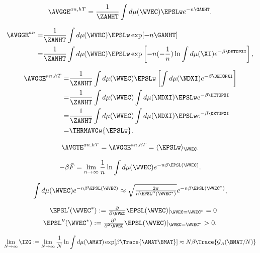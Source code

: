 \begin{align}
  \label{eqn:avgge_anhT}
  \AVGGE^{an, hT} = \frac{1}{\ZANHT}\int d\mu(\WVEC) \EPSLw e^{-n\GANHT}  .
\end{align}

\begin{align}
  \label{eqn:finalEgen0}
  \AVGGE^{an} =& \frac{1}{\ZANHT}\int d\mu(\WVEC) \EPSLw \exp[-n\GANHT] \\ \nonumber
  =& \frac{1}{\ZANHT}\int d\mu(\WVEC) \EPSLw \exp\left[-n(-\frac{1}{n})\ln  \int d\mu(\XI)e^{-\beta \DETOPXI}\right]  ,
\end{align}

\begin{align}
  \label{eqn:finalEgen}
  \AVGGE^{an,hT}
  =& \frac{1}{\ZANHT}\int d\mu(\WVEC)\EPSLw \left[\int d\mu(\NDXI)e^{-\beta \DETOPXI}\right] \\ \nonumber
  =& \frac{1}{\ZANHT}\int d\mu(\WVEC) \int d\mu(\NDXI) \EPSLw e^{-\beta \DETOPXI}\\ \nonumber
  =& \frac{1}{\ZANHT}\int d\mu(\WVEC) \int d\mu(\NDXI) \EPSLw e^{-\beta \DETOPXI}\\ \nonumber
  =& \THRMAVGw{\EPSLw}   .
\end{align}

\begin{align}
\label{eqn:final_equiv}
  \AVGTE^{an,hT}=\AVGGE^{an, hT}= \langle \EPSLw\rangle_{\WVEC} .
\end{align}

\begin{align}
  -\beta\bar{F} = \lim_{n\rightarrow \infty}\frac{1}{n}\ln \int d\mu(\WVEC) e^{-n\beta\EPSL(\WVEC)}  .
\end{align}

\begin{align}
  \label{eqn:SPA}
  \int d\mu(\WVEC) e^{-n\beta\EPSL(\WVEC)}\approx \sqrt{\tfrac{2\pi}{n\EPSL''(\WVEC^{*})}} e^{-n\beta\EPSL(\WVEC^{*})}  ,
\end{align}

\begin{align}
  \EPSL'(\WVEC^{*}):=\tfrac{\partial}{\partial \WVEC}\EPSL(\WVEC)\vert_{\WVEC=\WVEC^{*}}=0 \\
  \EPSL''(\WVEC^{*}):=\tfrac{\partial^{2}}{\partial^{2} \WVEC}\EPSL(\WVEC)\vert_{\WVEC=\WVEC^{*}}>0  .
\end{align}

\begin{align}
\label{eqn:hciz_prelim}
\lim_{N\rightarrow\infty}\IZG := \lim_{N\rightarrow\infty} \frac{1}{N}\ln \int d\mu(\AMAT) \exp[\beta\Trace{\AMAT\BMAT}] \approx N\beta\Trace{\mathcal{G}_{A}(\BMAT/N)}
\end{align}


